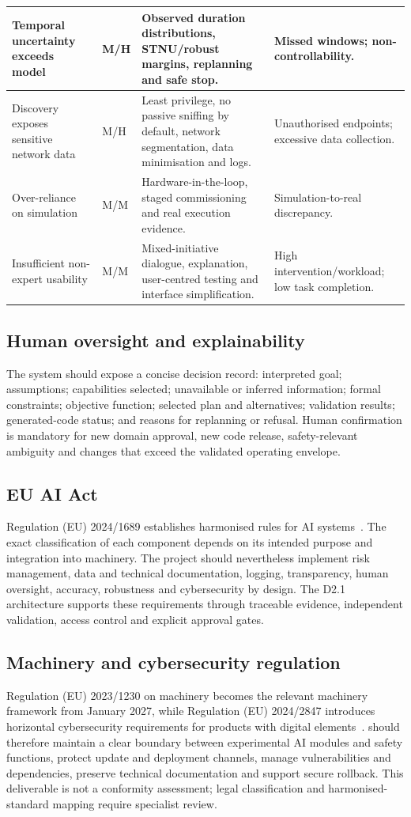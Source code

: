 \documentclass{plan4ari_report}
\begin{document}
{\begin{longtable}{|L{3.3cm}|L{1.6cm}|L{6.0cm}|L{3.8cm}|}
Temporal uncertainty exceeds model & M/H & Observed duration distributions, STNU/robust margins, replanning and safe stop. & Missed windows; non-controllability. \\ \hline
Discovery exposes sensitive network data & M/H & Least privilege, no passive sniffing by default, network segmentation, data minimisation and logs. & Unauthorised endpoints; excessive data collection. \\ \hline
Over-reliance on simulation & M/M & Hardware-in-the-loop, staged commissioning and real execution evidence. & Simulation-to-real discrepancy. \\ \hline
Insufficient non-expert usability & M/M & Mixed-initiative dialogue, explanation, user-centred testing and interface simplification. & High intervention/workload; low task completion. \\ \hline
\end{longtable}}

\subsection{Human oversight and explainability}
The system should expose a concise decision record: interpreted goal; assumptions; capabilities selected; unavailable or inferred information; formal constraints; objective function; selected plan and alternatives; validation results; generated-code status; and reasons for replanning or refusal. Human confirmation is mandatory for new domain approval, new code release, safety-relevant ambiguity and changes that exceed the validated operating envelope.

\subsection{EU AI Act}
Regulation (EU) 2024/1689 establishes harmonised rules for AI systems~\cite{eu2024aiact}. The exact classification of each \PlanARI{} component depends on its intended purpose and integration into machinery. The project should nevertheless implement risk management, data and technical documentation, logging, transparency, human oversight, accuracy, robustness and cybersecurity by design. The D2.1 architecture supports these requirements through traceable evidence, independent validation, access control and explicit approval gates.

\subsection{Machinery and cybersecurity regulation}
Regulation (EU) 2023/1230 on machinery becomes the relevant machinery framework from January 2027, while Regulation (EU) 2024/2847 introduces horizontal cybersecurity requirements for products with digital elements~\cite{eu2024cra,eu2023machinery}. \PlanARI{} should therefore maintain a clear boundary between experimental AI modules and safety functions, protect update and deployment channels, manage vulnerabilities and dependencies, preserve technical documentation and support secure rollback. This deliverable is not a conformity assessment; legal classification and harmonised-standard mapping require specialist review.
\end{document}
